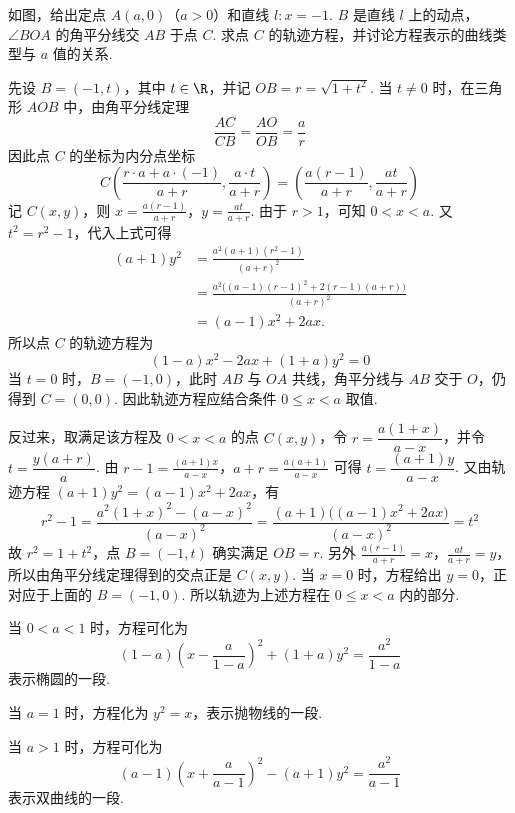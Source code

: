 \begin{problem}
如图，给出定点 \(A(a,0)\)（\(a>0\)）和直线 \(l\colon x=-1\). \(B\) 是直线 \(l\) 上的动点，\(\angle BOA\) 的角平分线交 \(AB\) 于点 \(C\). 求点 \(C\) 的轨迹方程，并讨论方程表示的曲线类型与 \(a\) 值的关系.

\end{problem}

\begin{solution}
先设 \(B=(-1,t)\)，其中 \(t\in\R\)，并记 \(OB=r=\sqrt{1+t^2}\). 当 \(t\neq0\) 时，在三角形 \(AOB\) 中，由角平分线定理
\[
\frac{AC}{CB}=\frac{AO}{OB}=\frac ar
\]
因此点 \(C\) 的坐标为内分点坐标
\[
C\left(\frac{r\cdot a+a\cdot(-1)}{a+r},\frac{a\cdot t}{a+r}\right)
=\left(\frac{a(r-1)}{a+r},\frac{at}{a+r}\right)
\]
记 \(C(x,y)\)，则
\(x=\frac{a(r-1)}{a+r}\)，\(y=\frac{at}{a+r}\).
由于 \(r>1\)，可知 \(0<x<a\). 又 \(t^2=r^2-1\)，代入上式可得
\[
\begin{aligned}
(a+1)y^2
&=\frac{a^2(a+1)(r^2-1)}{(a+r)^2}\\
&=\frac{a^2\bigl((a-1)(r-1)^2+2(r-1)(a+r)\bigr)}{(a+r)^2}\\
&=(a-1)x^2+2ax.
\end{aligned}
\]
所以点 \(C\) 的轨迹方程为
\[
(1-a)x^2-2ax+(1+a)y^2=0
\]
当 \(t=0\) 时，\(B=(-1,0)\)，此时 \(AB\) 与 \(OA\) 共线，角平分线与 \(AB\) 交于 \(O\)，仍得到 \(C=(0,0)\). 因此轨迹方程应结合条件 \(0\leqslant x<a\) 取值.

反过来，取满足该方程及 \(0<x<a\) 的点 \(C(x,y)\)，令 \(r=\dfrac{a(1+x)}{a-x}\)，并令 \(t=\dfrac{y(a+r)}a\). 由
\(r-1=\frac{(a+1)x}{a-x}\)，\(a+r=\frac{a(a+1)}{a-x}\)
可得 \(t=\dfrac{(a+1)y}{a-x}\). 又由轨迹方程 \((a+1)y^2=(a-1)x^2+2ax\)，有
\[
r^2-1=\frac{a^2(1+x)^2-(a-x)^2}{(a-x)^2}=\frac{(a+1)\bigl((a-1)x^2+2ax\bigr)}{(a-x)^2}=t^2
\]
故 \(r^2=1+t^2\)，点 \(B=(-1,t)\) 确实满足 \(OB=r\). 另外
\(\frac{a(r-1)}{a+r}=x\)，\(\frac{at}{a+r}=y\)，
所以由角平分线定理得到的交点正是 \(C(x,y)\). 当 \(x=0\) 时，方程给出 \(y=0\)，正对应于上面的 \(B=(-1,0)\). 所以轨迹为上述方程在 \(0\leqslant x<a\) 内的部分.

当 \(0<a<1\) 时，方程可化为
\[
(1-a)\left(x-\frac{a}{1-a}\right)^2+(1+a)y^2=\frac{a^2}{1-a}
\]
表示椭圆的一段.

当 \(a=1\) 时，方程化为 \(y^2=x\)，表示抛物线的一段.

当 \(a>1\) 时，方程可化为
\[
(a-1)\left(x+\frac{a}{a-1}\right)^2-(a+1)y^2=\frac{a^2}{a-1}
\]
表示双曲线的一段.
\end{solution}
